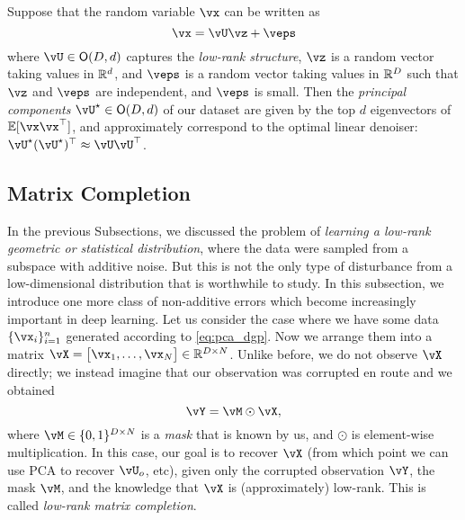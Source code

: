 \documentclass[../../book-main.tex]{subfiles}
\begin{document}
\begin{theorem}\label{thm:ppca}
    Suppose that the random variable \(\vx\) can be written as
    \begin{equation}
        \vx = \vU\vz + \veps
    \end{equation}
    where \(\vU \in \O(D, d)\) captures the \textit{low-rank structure}, \(\vz\)
    is a random vector taking values in \(\mathbb{R}^{d}\), and \(\veps\) is a random
    vector taking values in \(\mathbb{R}^{D}\) such that \(\vz\) and \(\veps\) are
    independent, and \(\veps\) is small. Then the \textit{principal components}
    \(\vU^{\star} \in \O(D, d)\) of our dataset are given by the top \(d\)
    eigenvectors of \(\Ex[\vx\vx^{\top}]\), and approximately correspond to the
    optimal linear denoiser: \(\vU^{\star}(\vU^{\star})^{\top} \approx \vU\vU^{\top}\).
\end{theorem}



\subsection{Matrix Completion}

In the previous Subsections, we discussed the problem of \textit{learning a low-rank geometric or statistical distribution}, where the data were sampled from a subspace with additive noise. But this is not the only type of disturbance from a low-dimensional distribution that is worthwhile to study. In this subsection, we introduce one more class of non-additive errors which become increasingly important in deep learning. Let us consider the case where we have some data \(\{\vx_{i}\}_{i = 1}^{n}\) generated according to \eqref{eq:pca_dgp}. Now we arrange them into a matrix \(\vX = \mat{\vx_{1}, \dots, \vx_{N}} \in \R^{D \times N}\). Unlike before, we do not observe \(\vX\) directly; we instead imagine that our observation was corrupted en route and we obtained 
\begin{equation}
    \vY = \vM \odot \vX,
\end{equation}
where \(\vM \in \{0, 1\}^{D \times N}\) is a \textit{mask} that is known by us, and \(\odot\) is element-wise multiplication. In this case, our goal is to recover \(\vX\) (from which point we can use PCA to recover \(\vU_{o}\), etc), given only the corrupted observation \(\vY\), the mask \(\vM\), and the knowledge that \(\vX\) is (approximately) low-rank. This is called \textit{low-rank matrix completion}.
\end{document}
